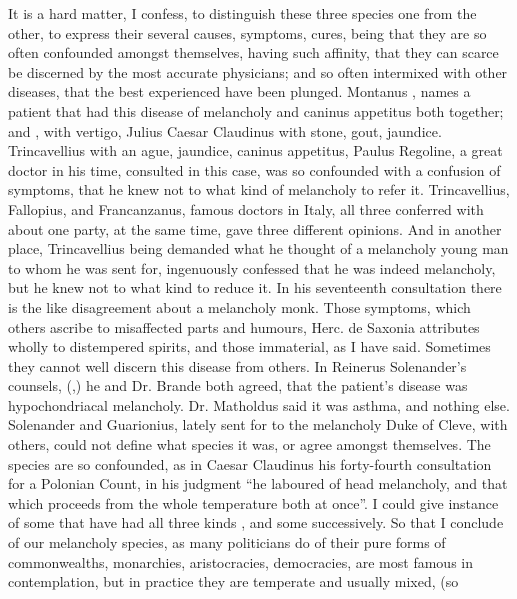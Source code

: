 It is a hard matter, I confess, to distinguish these three species one from the
other, to express their several causes, symptoms, cures, being that they are so
often confounded amongst themselves, having such affinity, that they can scarce
be discerned by the most accurate physicians; and so often intermixed with
other diseases, that the best experienced have been plunged. Montanus
, names a patient that had this disease of
melancholy and caninus appetitus both together; and
, with vertigo, Julius
Caesar Claudinus with stone, gout, jaundice. Trincavellius with an ague,
jaundice, caninus appetitus, \etc{} Paulus Regoline, a
great doctor in his time, consulted in this case, was so confounded with a
confusion of symptoms, that he knew not to what kind of melancholy to refer it.
Trincavellius, Fallopius, and Francanzanus, famous doctors
in Italy, all three conferred with about one party, at the same time, gave
three different opinions. And in another place, Trincavellius being demanded
what he thought of a melancholy young man to whom he was sent for, ingenuously
confessed that he was indeed melancholy, but he knew not to what kind to reduce
it. In his seventeenth consultation there is the like disagreement about a
melancholy monk. Those symptoms, which others ascribe to misaffected parts and
humours, Herc. de Saxonia attributes wholly to distempered
spirits, and those immaterial, as I have said. Sometimes they cannot well
discern this disease from others. In Reinerus Solenander's counsels,
(,) he and Dr. Brande both agreed, that
the patient's disease was hypochondriacal melancholy. Dr. Matholdus said it was
asthma, and nothing else. Solenander and Guarionius,
lately sent for to the melancholy Duke of Cleve, with others, could not define
what species it was, or agree amongst themselves. The species are so
confounded, as in Caesar Claudinus his forty-fourth consultation for a Polonian
Count, in his judgment \enquote{he laboured of head melancholy,
and that which proceeds from the whole temperature both at once}. I could give
instance of some that have had all three kinds , and some
successively. So that I conclude of our melancholy species, as
many politicians do of their pure forms of commonwealths,
monarchies, aristocracies, democracies, are most famous in contemplation, but
in practice they are temperate and usually mixed, (so
